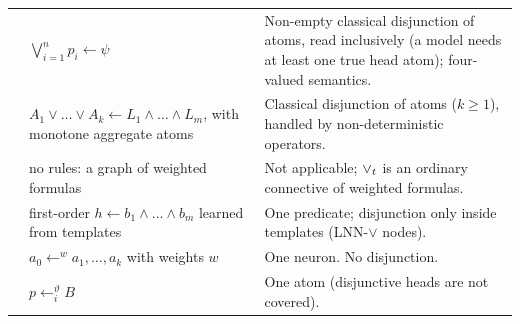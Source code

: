 {\begin{longtable}{@{}p{}p{}p{}@{}}
            \cite{HeyninckAB22arxiv}              & $\bigvee_{i=1}^np_i\leftarrow\psi$                                                                                                                      & Non-empty classical disjunction of atoms, read inclusively (a model needs at least one true head atom); four-valued semantics.                                                                                                      \\
            \cite{PelovT04}                       & $A_1\lor\dots\lor A_k\leftarrow L_1\land\dots\land L_m$, with monotone aggregate atoms                                                                  & Classical disjunction of atoms ($k\geq1$), handled by non-deterministic operators.                                                                                                                                                  \\
            \cite{RiegelEtAl20}                   & no rules: a graph of weighted formulas                                                                                                                  & Not applicable; $\lor_t$ is an ordinary connective of weighted formulas.                                                                                                                                                          \\
            \cite{SenCRG22}                       & first-order $h\leftarrow b_1\land\dots\land b_m$ learned from templates                                                                                 & One predicate; disjunction only inside templates (LNN-$\lor$ nodes).                                                                                                                                                                \\
            \cite{Antic24}                        & $a_0\leftarrow^{w}a_1,\dots,a_k$ with weights $w$                                                                                                       & One neuron. No disjunction.                                                                                                                                                                                                         \\
            \cite{KettmannHS25}                   & $p\leftarrow^{\vartheta}_iB$                                                                                                                            & One atom (disjunctive heads are not covered).                                                                                                                                                                                       \\

\end{longtable}}
